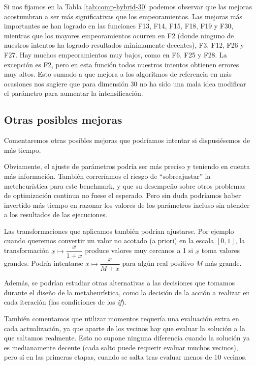 \documentclass{article}
\begin{document}
Si nos fijamos en la Tabla \ref{tab:comp-hybrid-30} podemos observar que las mejoras acostumbran a ser más significativas que los
 empeoramientos. Las mejoras más importantes se han logrado en las funciones F13, F14, F15, F18, F19 y F30, mientras que los
 mayores empeoramientos ocurren en F2 (donde ninguno de nuestros intentos ha logrado resultados mínimamente decentes), F3, F12, F26
 y F27. Hay muchos empeoramientos muy bajos, como en F6, F25 y F28. La excepción es F2, pero en esta función todos nuestros intentos
 obtienen errores muy altos. Esto sumado a que mejora a los algoritmos de referencia en más ocasiones nos sugiere que para
 dimensión 30 no ha sido
 una mala idea modificar el parámetro para aumentar la intensificación.

\subsection{Otras posibles mejoras}

Comentaremos otras posibles mejoras que podríamos intentar si dispusiésemos de más tiempo.

Obviamente, el ajuste de parámetros podría ser más preciso y teniendo en cuenta más información. También correríamos el riesgo
de ``sobreajustar'' la meteheurística para este benchmark, y que su desempeño sobre otros problemas de optimización continua no
fuese el esperado. Pero sin duda podríamos haber invertido más tiempo en razonar los valores de los parámetros incluso sin atender
a los resultados de las ejecuciones.

Las transformaciones que aplicamos también podrían ajustarse. Por ejemplo cuando queremos convertir un valor no acotado (a priori)
en la escala $[0,1]$, la transformación $x\mapsto \dfrac{x}{1+x}$ produce valores muy cercanos a 1 si $x$ toma valores grandes.
Podría intentarse $x\mapsto \dfrac{x}{M+x}$ para algún real positivo $M$ más grande.

Además, se podrían estudiar otras alternativas a las decisiones que tomamos durante el diseño de la metaheurística, como la decisión
de la acción a realizar en cada iteración (las condiciones de los \emph{if}).

También comentamos que utilizar momentos requería una evaluación extra en cada actualización, ya que aparte de los vecinos hay que
evaluar la solución a la que saltamos realmente. Esto no supone ninguna diferencia cuando la solución ya es medianamente decente
(cada salto puede requerir evaluar muchos vecinos), pero sí en las primeras etapas, cuando se salta tras evaluar menos de 10 vecinos.
\end{document}
